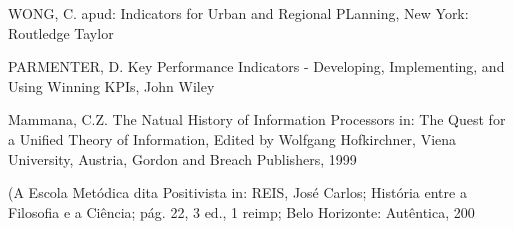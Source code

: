 \documentclass[
12pt,		%
openright,	%
twoside,  %
a4paper,			%
chapter=TITLE,		%
english,			%
french,				%
spanish,			%
brazil				%
]{USPSC-classe/USPSC}
\begin{document}
\begin{flushleft}
\begin{flushleft}
\begin{flushleft}
\begin{flushleft}
[WONG, 2006] WONG, C. apud: Indicators for Urban and Regional PLanning, New York: Routledge Taylor 
\end{flushleft}


\end{flushleft}


\end{flushleft}


\end{flushleft}


\begin{flushleft}
\begin{flushleft}
\begin{flushleft}
\begin{flushleft}
[PARMENTER, 2007] PARMENTER, D. Key Performance Indicators - Developing, Implementing, and Using Winning KPIs, John Wiley 
\end{flushleft}


\end{flushleft}


\end{flushleft}


\end{flushleft}


\begin{flushleft}
\begin{flushleft}
\begin{flushleft}
\begin{flushleft}
[MAMMANA, 1999] Mammana, C.Z. The Natual History of Information Processors in: The Quest for a Unified Theory of Information, Edited by Wolfgang Hofkirchner, Viena University, Austria, Gordon and Breach Publishers, 1999
\end{flushleft}


\end{flushleft}


\end{flushleft}


\end{flushleft}


\begin{flushleft}
\begin{flushleft}
\begin{flushleft}
\begin{flushleft}
[REIS , 2006] (A Escola Met\'odica dita Positivista in: REIS, Jos\'e Carlos; Hist\'oria entre a Filosofia e a Ci\^encia; p\'ag. 22, 3 ed., 1 reimp; Belo Horizonte: Aut\^entica, 200
\end{flushleft}


\end{flushleft}


\end{flushleft}


\end{flushleft}
\end{document}
